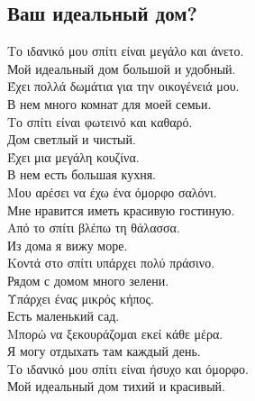 \documentclass[12pt]{article}
\newcommand{\my}[1]{\textcolor{gray!80!white}{#1}}
\newenvironment{page}{\clearpage\normalsize\null\vfill}{\vfill\null}
\newenvironment{textblock}{\begin{minipage}{\textwidth}}{\end{minipage}\smallskip}
\begin{document}
	\begin{page}
		\subsection{Ваш идеальный дом?}
		\begin{textblock}
			Το ιδανικό μου σπίτι είναι μεγάλο και άνετο.\\
            \my{Мой идеальный дом большой и удобный.}\\
			Έχει πολλά δωμάτια για την οικογένειά μου.\\
            \my{В нем много комнат для моей семьи.}\\
			Το σπίτι είναι φωτεινό και καθαρό. \\
            \my{Дом светлый и чистый.}\\
			Έχει μια μεγάλη κουζίνα. \\
            \my{В нем есть большая кухня.}\\
			Μου αρέσει να έχω ένα όμορφο σαλόνι.\\
            \my{Мне нравится иметь красивую гостиную.}\\
			Από το σπίτι βλέπω τη θάλασσα. \\
            \my{Из дома я вижу море.}\\
			Κοντά στο σπίτι υπάρχει πολύ πράσινο.\\
            \my{Рядом с домом много зелени.}\\
			Υπάρχει ένας μικρός κήπος. \\
            \my{Есть маленький сад.}\\
			Μπορώ να ξεκουράζομαι εκεί κάθε μέρα.\\
            \my{Я могу отдыхать там каждый день.}\\
			Το ιδανικό μου σπίτι είναι ήσυχο και όμορφο.\\
            \my{Мой идеальный дом тихий и красивый.}\\
		\end{textblock}
	\end{page}
\end{document}
